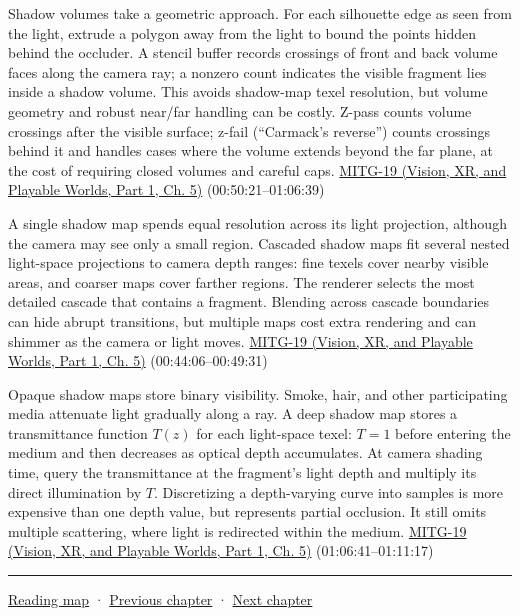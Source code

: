 Shadow volumes take a geometric approach. For each silhouette edge as seen from the light, extrude a polygon away from the light to bound the points hidden behind the occluder. A stencil buffer records crossings of front and back volume faces along the camera ray; a nonzero count indicates the visible fragment lies inside a shadow volume. This avoids shadow-map texel resolution, but volume geometry and robust near/far handling can be costly. Z-pass counts volume crossings after the visible surface; z-fail (``Carmack's reverse'') counts crossings behind it and handles cases where the volume extends beyond the far plane, at the cost of requiring closed volumes and careful caps. \href{../07-Vision-XR-and-Playable-Worlds-P01/main.pdf\#nameddest=04-visual-computing-ii-ch036-mitg-19---shadow-maps}{MITG-19 (Vision, XR, and Playable Worlds, Part 1, Ch. 5)} (00:50:21--01:06:39)

A single shadow map spends equal resolution across its light projection, although the camera may see only a small region. Cascaded shadow maps fit several nested light-space projections to camera depth ranges: fine texels cover nearby visible areas, and coarser maps cover farther regions. The renderer selects the most detailed cascade that contains a fragment. Blending across cascade boundaries can hide abrupt transitions, but multiple maps cost extra rendering and can shimmer as the camera or light moves. \href{../07-Vision-XR-and-Playable-Worlds-P01/main.pdf\#nameddest=04-visual-computing-ii-ch036-mitg-19---shadow-maps}{MITG-19 (Vision, XR, and Playable Worlds, Part 1, Ch. 5)} (00:44:06--00:49:31)

Opaque shadow maps store binary visibility. Smoke, hair, and other participating media attenuate light gradually along a ray. A deep shadow map stores a transmittance function \(T(z)\) for each light-space texel: \(T=1\) before entering the medium and then decreases as optical depth accumulates. At camera shading time, query the transmittance at the fragment's light depth and multiply its direct illumination by \(T\). Discretizing a depth-varying curve into samples is more expensive than one depth value, but represents partial occlusion. It still omits multiple scattering, where light is redirected within the medium. \href{../07-Vision-XR-and-Playable-Worlds-P01/main.pdf\#nameddest=04-visual-computing-ii-ch036-mitg-19---shadow-maps}{MITG-19 (Vision, XR, and Playable Worlds, Part 1, Ch. 5)} (01:06:41--01:11:17)

\begin{center}\rule{0.5\linewidth}{0.5pt}\end{center}

\hyperref[volume-reading-map]{Reading map} · \hyperref[04-visual-computing-ii-ch027-mesh-queries-classification-and-clipping]{Previous chapter} · \hyperref[04-visual-computing-ii-ch029-acceleration-structures-and-robust-queries]{Next chapter}
